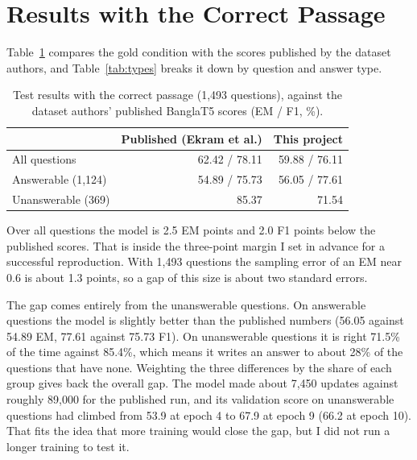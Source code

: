 \section{Results with the Correct Passage}
\label{sec:gold}

Table~\ref{tab:gold} compares the gold condition with the scores published by the dataset authors, and Table~\ref{tab:types} breaks it down by question and answer type.

\begin{table}[H]
	\centering
	\caption{Test results with the correct passage (1,493 questions), against the dataset authors' published BanglaT5 scores (EM / F1, \%).}
	\label{tab:gold}
	\begin{tabular}{lrr}
		\toprule
		 & Published (Ekram et al.) & This project \\
		\midrule
		All questions & 62.42 / 78.11 & 59.88 / 76.11 \\
		Answerable (1,124) & 54.89 / 75.73 & 56.05 / 77.61 \\
		Unanswerable (369) & 85.37 & 71.54 \\
		\bottomrule
	\end{tabular}
\end{table}

Over all questions the model is 2.5 EM points and 2.0 F1 points below the published scores. That is inside the three-point margin I set in advance for a successful reproduction. With 1,493 questions the sampling error of an EM near 0.6 is about 1.3 points, so a gap of this size is about two standard errors.

The gap comes entirely from the unanswerable questions. On answerable questions the model is slightly better than the published numbers (56.05 against 54.89 EM, 77.61 against 75.73 F1). On unanswerable questions it is right 71.5\% of the time against 85.4\%, which means it writes an answer to about 28\% of the questions that have none. Weighting the three differences by the share of each group gives back the overall gap. The model made about 7,450 updates against roughly 89,000 for the published run, and its validation score on unanswerable questions had climbed from 53.9 at epoch 4 to 67.9 at epoch 9 (66.2 at epoch 10). That fits the idea that more training would close the gap, but I did not run a longer training to test it.

